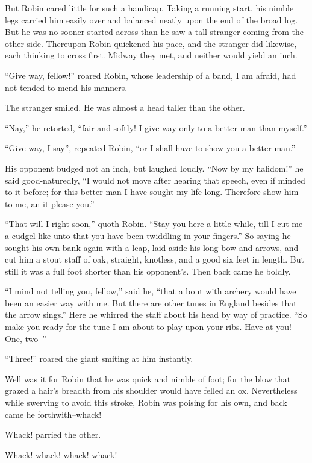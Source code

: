But Robin cared little for such a handicap. Taking a running start, his
nimble legs carried him easily over and balanced neatly upon the end of
the broad log. But he was no sooner started across than he saw a tall
stranger coming from the other side. Thereupon Robin quickened his pace,
and the stranger did likewise, each thinking to cross first. Midway they
met, and neither would yield an inch.

``Give way, fellow!'' roared Robin, whose leadership of a band, I am
afraid, had not tended to mend his manners.

The stranger smiled. He was almost a head taller than the other.

``Nay,'' he retorted, ``fair and softly! I give way only to a better man
than myself.''

``Give way, I say'', repeated Robin, ``or I shall have to show you a
better man.''

His opponent budged not an inch, but laughed loudly. ``Now by my
halidom!'' he said good-naturedly, ``I would not move after hearing that
speech, even if minded to it before; for this better man I have sought
my life long. Therefore show him to me, an it please you.''

``That will I right soon,'' quoth Robin. ``Stay you here a little while,
till I cut me a cudgel like unto that you have been twiddling in your
fingers.'' So saying he sought his own bank again with a leap, laid
aside his long bow and arrows, and cut him a stout staff of oak,
straight, knotless, and a good six feet in length. But still it was a
full foot shorter than his opponent's. Then back came he boldly.

``I mind not telling you, fellow,'' said he, ``that a bout with archery
would have been an easier way with me. But there are other tunes in
England besides that the arrow sings.'' Here he whirred the staff about
his head by way of practice. ``So make you ready for the tune I am about
to play upon your ribs. Have at you! One, two--''

``Three!'' roared the giant smiting at him instantly.

Well was it for Robin that he was quick and nimble of foot; for the blow
that grazed a hair's breadth from his shoulder would have felled an ox.
Nevertheless while swerving to avoid this stroke, Robin was poising for
his own, and back came he forthwith--whack!

Whack! parried the other.

Whack! whack! whack! whack!

